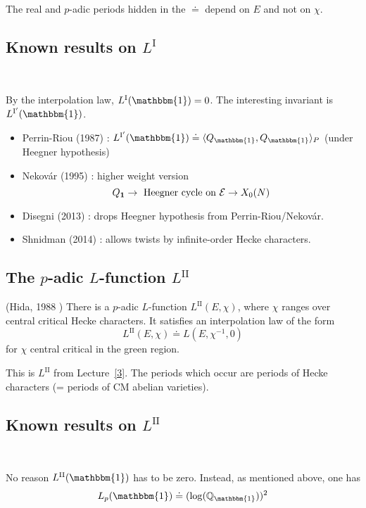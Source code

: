 \documentclass[12pt,amsfont]{amsart}
\begin{document}
The real and $p$-adic periods hidden in the $\doteq$ depend on $E$ and not on $\chi$. 

\subsection{Known results on $L^{\text{I}}$}
{\ }

By the interpolation law, $L^{\text{I}}(\mathbbm{1}) = 0$. The interesting invariant is $L^{\text{I}'}(\mathbbm{1})$. 
{\ }
\begin{itemize}
\item 
Perrin-Riou (1987) : $L^{\text{I}'}(\mathbbm{1}) \doteq \langle Q_{\mathbbm{1}}, Q_{\mathbbm{1}} \rangle_P$ (under Heegner hypothesis) 
\item
Nekov\'{a}r (1995) : higher weight version
\[Q_{\textbf{1}} \rightarrow \text{ Heegner cycle on } \mathcal{E} \rightarrow X_0(N)\]
\item
Disegni (2013) : drops Heegner hypothesis from Perrin-Riou/Nekov\'{a}r.
\item
Shnidman (2014) : allows twists by infinite-order Hecke characters.
\end{itemize}

\subsection{The $p$-adic $L$-function $L^{\text{II}}$}

\begin{thm} (Hida, 1988 ) There is a $p$-adic $L$-function $L^{\text{II}}(E, \chi)$, where $\chi$ ranges over central critical Hecke characters. It satisfies an interpolation law of the form
\[L^{\text{II}}(E, \chi) \doteq L(E, \chi^{-1}, 0)\]
for $\chi$ central critical in the green region. 
\end{thm}

\begin{rmk} This is $L^{\text{II}}$ from Lecture~\ref{3}. The periods which occur are periods of Hecke characters (= periods of CM abelian varieties). 
\end{rmk}

\subsection{Known results on $L^{\text{II}}$}
{\ }

No reason $L^{\text{II}}(\mathbbm{1})$ has to be zero. Instead, as mentioned above, one has
\[L_p(\mathbbm{1}) \doteq (\log(\bQ_{\mathbbm{1}}))^2\]
\end{document}
